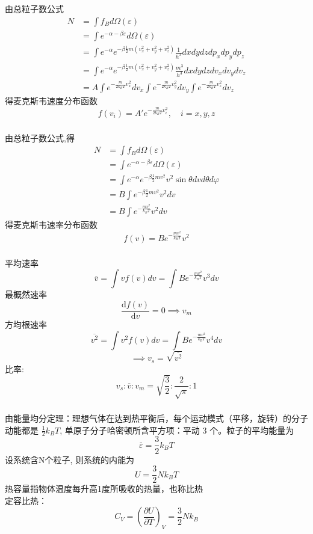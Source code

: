 \begin{frame}
  \frametitle{}
  \解 
  由总粒子数公式
\[ 
  \begin{aligned}
    N &= \int f_{B} d\Omega(\varepsilon) \\ 
   &= \int e^{-\alpha -\beta \varepsilon } d\Omega(\varepsilon) \\
   &= \int e^{-\alpha }e^{-\beta \frac{1}{2}m (v_x^2 + v_y^2 + v_z^2 )} \frac{1}{h^3} dxdydzdp_xdp_y dp_z \\
   &= \int e^{-\alpha } e^{-\beta \frac{1}{2}m (v_x^2 + v_y^2 + v_z^2 )} \frac{m^3}{h^3} dxdydzdv_xdv_y dv_z \\
   &= A \int e^{-\frac{m}{2k_B T}v_x^2} d v_x \int e^{-\frac{m}{2k_B T}v_y^2} d v_y \int e^{-\frac{m}{2k_B T}v_z^2} dv_z   
  \end{aligned}  \]
  得麦克斯韦速度分布函数
  \[ f(v_i) = A' e^{-\frac{m}{2k_B T}v_i^2}, \quad  i = x,y,z  \]
\end{frame} 

\begin{frame}
  \frametitle{}
  \解 
  由总粒子数公式,得
  \[ 
  \begin{aligned}
    N &= \int f_{B} d\Omega(\varepsilon) \\ 
   &= \int e^{-\alpha -\beta \varepsilon } d\Omega(\varepsilon) \\
   &= \int e^{-\alpha }e^{-\beta \frac{1}{2}mv^2} v^2 \sin \theta d v d \theta d\varphi \\
   &= B\int e^{-\beta \frac{1}{2}mv^2} v^2 d v \\
   &= B\int e^{- \frac{mv^2}{k_BT}} v^2 d v 
  \end{aligned}  \]
  得麦克斯韦速率分布函数
  \[  f(v) = B e^{- \frac{mv^2}{k_BT}} v^2  \]
\end{frame} 

\begin{frame}
  \frametitle{}
平均速率
\[ \overline{v} = \int v f(v) dv = \int B e^{- \frac{mv^2}{k_BT}} v^3 dv\]
最概然速率
\[ \frac{\mathrm{d}f(v)}{\mathrm{d} v}= 0 \implies v_{m} \]
方均根速率
\[ \overline{v^2} = \int v^2 f(v) dv = \int B e^{- \frac{mv^2}{k_BT}} v^4 dv\]
\[ \implies v_s = \sqrt{\overline{v^2}} \] 
比率:
\[ \boxed{v_s: \overline{v} : v_{m} = \sqrt{\frac{3}{2}} : \frac{2}{\sqrt{\pi}} : 1}  \]
\end{frame} 

\begin{frame}
  \frametitle{}
  \解 由能量均分定理：理想气体在达到热平衡后，每个运动模式（平移，旋转）的分子动能都是 $\frac{1}{2}k_BT$,
  单原子分子哈密顿所含平方项：平动 3 个。粒子的平均能量为
  \[ \overline{\varepsilon }  = \frac{3}{2}k_BT\]
  设系统含N个粒子, 则系统的内能为
  \[ U= \frac{3}{2} N k_BT\]
  热容量指物体温度每升高1度所吸收的热量，也称比热 \\
  定容比热： 
  \[ C_V = \left(\frac{\partial U}{\partial T }\right)_V = \frac{3}{2} N k_B\]
\end{frame} 

